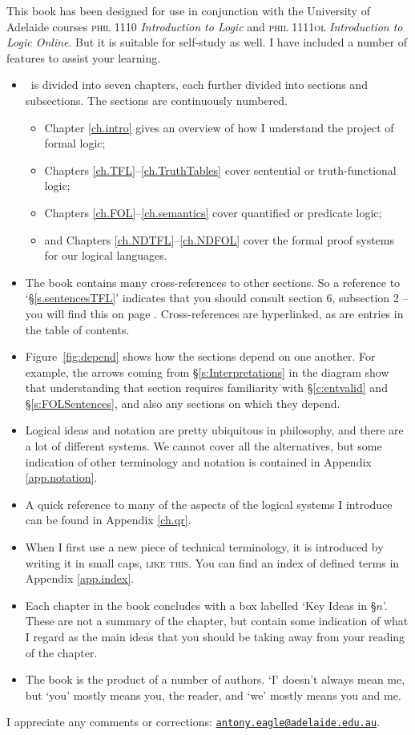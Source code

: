 {This book has been designed for use in conjunction with the University of Adelaide courses \textsc{phil} 1110 \emph{Introduction to Logic} and \textsc{phil 1111ol} \emph{Introduction to Logic Online}. But it is suitable for self-study as well. I have included a number of features to assist your learning. \begin{itemize}
	\item \forallx\ is divided into seven chapters, each further divided into sections and subsections. The sections are continuously numbered. \begin{itemize}
		\item Chapter \ref{ch.intro} gives an overview of how I understand the project of formal logic;
		\item Chapters \ref{ch.TFL}–\ref{ch.TruthTables} cover sentential or truth-functional logic;
		\item Chapters \ref{ch.FOL}–\ref{ch.semantics} cover quantified or predicate logic;
		\item and Chapters \ref{ch.NDTFL}–\ref{ch.NDFOL} cover the formal proof systems for our logical languages.
	\end{itemize}
	\item The book contains many cross-references to other sections. So a reference to `§\ref{s.sentencesTFL}' indicates that you should consult section 6, subsection 2 – you will find this on page \pageref{s.sentencesTFL}. Cross-references are hyperlinked, as are entries in the table of contents.
	\item  Figure~\ref{fig:depend} shows how the sections depend on one another. For example, the arrows coming from §\ref{s:Interpretations} in the diagram show that understanding that section requires familiarity with §\ref{c:entvalid} and §\ref{s:FOLSentences}, and also any sections on which they depend.
	\item Logical ideas and notation are pretty ubiquitous in philosophy, and there are a lot of different systems. We cannot cover all the alternatives, but some indication of other terminology and notation is contained in Appendix \ref{app.notation}.
	\item A quick reference to many of the aspects of the logical systems I introduce can be found in Appendix \ref{ch.qr}.
	\item When I first use a new piece of technical terminology, it is introduced by writing it in small caps, \textsc{like this}. You can find an index of defined terms in Appendix \ref{app.index}.
	\item Each chapter in the book concludes with a box labelled `Key Ideas in §$n$'. These are not a summary of the chapter, but contain some indication of what I regard as the main ideas that you should be taking away from your reading of the chapter. 
	\item The book is the product of a number of authors. `I' doesn't always mean me, but `you' mostly means you, the reader, and `we' mostly means you and me.
\end{itemize}
I appreciate any comments or corrections: \href{mailto:antony.eagle@adelaide.edu.au}{\nolinkurl{antony.eagle@adelaide.edu.au}}.

}
